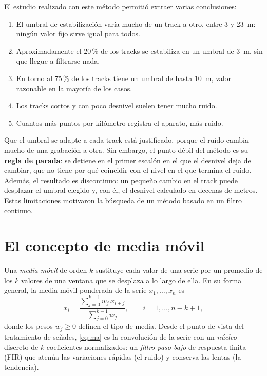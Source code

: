\documentclass[11pt,a4paper]{article}
\begin{document}
El estudio realizado con este método permitió extraer varias conclusiones:
\begin{enumerate}
    \item El umbral de estabilización varía mucho de un track a otro, entre 3
          y 23~m: ningún valor fijo sirve igual para todos.
    \item Aproximadamente el 20\,\% de los tracks se estabiliza en un umbral
          de 3~m, sin que llegue a filtrarse nada.
    \item En torno al 75\,\% de los tracks tiene un umbral de hasta 10~m, valor
          razonable en la mayoría de los casos.
    \item Los tracks cortos y con poco desnivel suelen tener mucho ruido.
    \item Cuantos más puntos por kilómetro registra el aparato, más ruido.
\end{enumerate}

Que el umbral se adapte a cada track está justificado, porque el ruido cambia
mucho de una grabación a otra. Sin embargo, el punto débil del método es su
\textbf{regla de parada}: se detiene en el primer escalón en el que el desnivel
deja de cambiar, que no tiene por qué coincidir con el nivel en el que termina
el ruido. Además, el resultado es discontinuo: un pequeño cambio en el track
puede desplazar el umbral elegido y, con él, el desnivel calculado en decenas de
metros. Estas limitaciones motivaron la búsqueda de un método basado en un
filtro continuo.

\section{El concepto de media móvil}

Una \emph{media móvil} de orden $k$ sustituye cada valor de una serie por un
promedio de los $k$ valores de una ventana que se desplaza a lo largo de ella.
En su forma general, la media móvil ponderada de la serie $x_1, \dots, x_n$ es
\begin{equation}
    \bar{x}_i = \frac{\sum_{j=0}^{k-1} w_j\, x_{i+j}}{\sum_{j=0}^{k-1} w_j},
    \qquad i = 1, \dots, n - k + 1,
    \label{eq:ma}
\end{equation}
donde los pesos $w_j \geq 0$ definen el tipo de media. Desde el punto de vista
del tratamiento de señales, \eqref{eq:ma} es la convolución de la serie con un
\emph{núcleo} discreto de $k$ coeficientes normalizados: un \emph{filtro paso
bajo} de respuesta finita (FIR) que atenúa las variaciones rápidas (el ruido) y
conserva las lentas (la tendencia).
\end{document}

